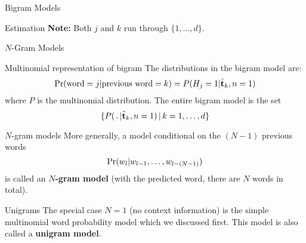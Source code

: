 \documentclass[dvipsnames,mathserif]{beamer}
\begin{document}
{\begin{frame}{Bigram Models}
\begin{block}{Estimation}
    \textbf{Note:} Both $j$ and $k$ run through $\lbrace
    1,\ldots,d\rbrace$.
  \end{block}
\end{frame}


\begin{frame}{$N$-Gram Models}
  \begin{block}{Multinomial representation of bigram}
    The distributions in the bigram model are:
\vspace{-1mm}
    \begin{equation*}
      \mbox{Pr}(\text{word}=j|\text{previous word}=k)
      =
      P(H_j=1|\hat{\mathbf{t}}_k, n=1)
    \end{equation*}
    where $P$ is the multinomial distribution. The entire bigram model
    is the set
    \begin{equation*}
      \lbrace P(\,.\,|\hat{\mathbf{t}}_k, n=1) \,|\, k=1,\ldots,d \rbrace
    \end{equation*}
  \end{block}
\vspace{-3mm}
  \begin{block}{$N$-gram models}
    More generally, a model conditional on the $(N-1)$ previous words
    \begin{equation*}
      \mbox{Pr}(w_l|w_{l-1},\ldots,w_{l-(N-1)})
    \end{equation*}
    is called an \textbf{$N$-gram model} (with the predicted word,
    there are $N$ words in total).
  \end{block}
  \begin{block}{Unigrams}
    The special case $N=1$ (no context information) is the
    simple multinomial word probability model which we
    discussed first. This model is also called a \textbf{unigram
      model}.
  \end{block}
\end{frame}


}
\end{document}
